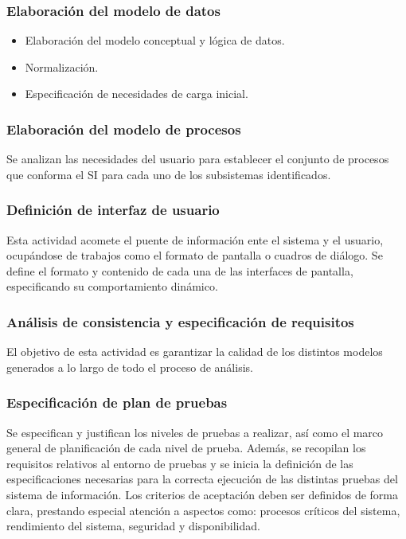\documentclass[11pt,a4paper,spanish,twoside]{book}
\begin{document}
\subsubsection{Elaboración del modelo de datos}
    \begin{itemize}
    \item Elaboración del modelo conceptual y lógica de datos.
    \item Normalización.
    \item Especificación de necesidades de carga inicial.
    \end{itemize}

\subsubsection{Elaboración del modelo de procesos}
Se analizan las necesidades del usuario para establecer el conjunto de procesos
que conforma el SI para cada uno de los subsistemas identificados.

\subsubsection{Definición de interfaz de usuario}
Esta actividad acomete el puente de información ente el sistema y el usuario, 
ocupándose de trabajos como el formato de pantalla o cuadros de diálogo. Se 
define el formato y contenido de cada una de las interfaces de pantalla, 
especificando su comportamiento dinámico.

\subsubsection{Análisis de consistencia y especificación de requisitos}
El objetivo de esta actividad es garantizar la calidad de los distintos modelos
generados a lo largo de todo el proceso de análisis.

\subsubsection{Especificación de plan de pruebas}
Se especifican y justifican los niveles de pruebas a realizar, así como el 
marco general de planificación de cada nivel de prueba. Además, se recopilan 
los requisitos relativos al entorno de pruebas y se inicia la definición de las
especificaciones necesarias para la correcta ejecución de las distintas
pruebas del sistema de información. Los criterios de aceptación deben
ser definidos de forma clara, prestando especial atención a aspectos como:
procesos críticos del sistema, rendimiento del sistema, seguridad y 
disponibilidad.
\end{document}
